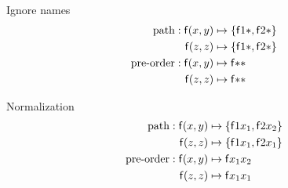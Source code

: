 

	
	\begin{block}{Ignore names}
		\vspace{-1em}
	\begin{align*}
		\text{path}: {\mathsf f}(x,y)  &\mapsto \{ {\mathsf f} 1 {*}, {\mathsf f} 2 {*} \}
		\\
		{\mathsf f}(z,z)  &\mapsto \{ {\mathsf f} 1 {*}, {\mathsf f} 2 {*} \}
		\\
		\text{pre-order}:
		{\mathsf f}(x,y) &\mapsto {\mathsf f} {*} {*}
		\\
		{\mathsf f}(z,z) &\mapsto {\mathsf f} {*} {*}
			\end{align*}
			\end{block}
%	

\begin{block}{Normalization}
	\vspace{-1em}	
	\begin{align*}
		\text{path}: {\mathsf f}(x,y)  &\mapsto \{ {\mathsf f} 1 {x_1}, {\mathsf f} 2 {x_2}  \}
		\\
		{\mathsf f}(z,z)  &\mapsto \{ {\mathsf f} 1 {x_1}, {\mathsf f} 2 {x_1} \}
		\\
		\text{pre-order}:
		{\mathsf f}(x,y) &\mapsto {\mathsf f} {x_1} {x_2}
		\\
		{\mathsf f}(z,z) &\mapsto {\mathsf f} {x_1} {x_1}
	\end{align*}
	\end{block}